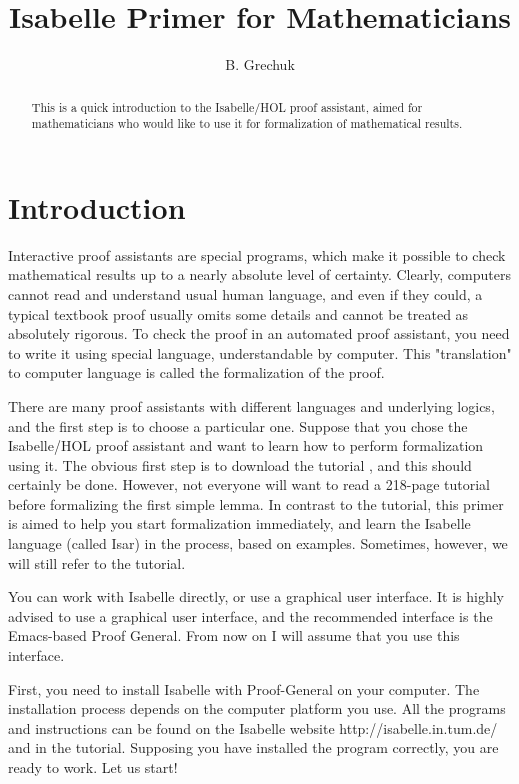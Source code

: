 \documentclass[11pt]{article}
\title{{\bf Isabelle Primer for Mathematicians}}
\author{B. Grechuk}
\date{}
\begin{document}
\maketitle

\begin{abstract}
    This is a quick introduction to the Isabelle/HOL proof assistant, aimed for mathematicians who would like to use it for formalization of mathematical results.
\end{abstract}

\section{Introduction}

Interactive proof assistants are special programs, which make it possible to check mathematical results up to a nearly absolute level of certainty. Clearly, computers cannot read and understand usual human language, and even if they could, a typical textbook proof usually omits some details and cannot be treated as absolutely rigorous. To check the proof in an automated proof assistant, you need to write it using special language, understandable by computer. This "translation" to computer language is called the formalization of the proof.

There are many proof assistants with different languages and underlying logics, and the first step is to choose a particular one. Suppose that you chose the Isabelle/HOL proof assistant and want to learn how to perform formalization using it. The obvious first step is to download the tutorial \cite{tutorial}, and this should certainly be done. However, not everyone will want to read a 218-page tutorial before formalizing the first simple lemma. In contrast to the tutorial, this primer is aimed to help you start formalization immediately, and learn the Isabelle language (called Isar) in the process, based on examples. Sometimes, however, we will still refer to the tutorial.

You can work with Isabelle directly, or use a graphical user interface. It is highly advised to use a graphical user interface, and the recommended interface is the Emacs-based Proof General. From now on I will assume that you use this interface.

First, you need to install Isabelle with Proof-General on your computer. The installation process depends on the computer platform you use. All the programs and instructions can be found on the Isabelle website http://isabelle.in.tum.de/ and in the tutorial. Supposing you have installed the program correctly, you are ready to work. Let us start!
\end{document}
